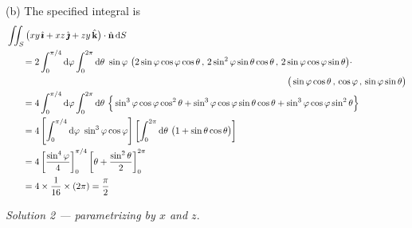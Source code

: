 \begin{solution}
(b)
The specified integral is
\begin{align*}
&\dblInt_S \big(xy\,\hi + xz\,\hj + zy\,\hk\big)\cdot\hn\,\dee{S} \\
&\hskip0.25in=
   2\int_0^{\pi/4}\dee{\varphi} \int_0^{2\pi}\dee{\theta}\ \sin\varphi\ 
   \big(2\sin\varphi\cos\varphi\cos\theta\,,\,
      2\sin^2\varphi\sin\theta\cos\theta\,,\,
      2\sin\varphi\cos\varphi\sin\theta\big)\cdot \\&\hskip4.3in
\big(\sin\varphi\cos\theta\,,\,\cos\varphi\,,\, \sin\varphi\sin\theta\big) \\
&\hskip0.25in=
   4\int_0^{\pi/4}\dee{\varphi} \int_0^{2\pi}\dee{\theta}\ 
   \Big\{\sin^3\varphi\cos\varphi\cos^2\theta
        +\sin^3\varphi\cos\varphi\sin\theta\cos\theta
        +\sin^3\varphi\cos\varphi\sin^2\theta
   \Big\} \\
&\hskip0.25in= 4
   \left[\int_0^{\pi/4}\dee{\varphi}\ \sin^3\varphi\cos\varphi\right]
   \left[\int_0^{2\pi}\dee{\theta}\ \big(1+\sin\theta\cos\theta\big)\right] \\
&\hskip0.25in= 4\left[\frac{\sin^4\varphi}{4}\right]_0^{\pi/4}
                 \left[\theta+\frac{\sin^2\theta}{2}\right]_0^{2\pi} \\
&\hskip0.25in= 4\times \frac{1}{16}\times (2\pi)
=\frac{\pi}{2}
\end{align*}

\emph{Solution 2 --- parametrizing by $x$ and $z$}.


\end{solution}
